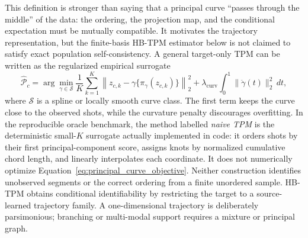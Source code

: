 \documentclass[preprint,12pt,number]{elsarticle}
\begin{document}
This definition is stronger than saying that a principal curve ``passes through the middle'' of the data: the ordering, the projection map, and the conditional expectation must be mutually compatible. It motivates the trajectory representation, but the finite-basis HB-TPM estimator below is not claimed to satisfy exact population self-consistency. A general target-only TPM can be written as the regularized empirical surrogate
\begin{equation}
	\widehat{\mathcal{P}}_c
	=
	\arg\min_{\gamma\in\mathcal{S}}
	\frac{1}{K}\sum_{k=1}^{K}
	\left\lVert
		z_{c,k}-\gamma\{\pi_\gamma(z_{c,k})\}
	\right\rVert_2^2
	+
	\lambda_{\mathrm{curv}}
	\int_0^1 \lVert \ddot{\gamma}(t)\rVert_2^2\,dt ,
	\label{eq:principal_curve_objective}
\end{equation}
where $\mathcal{S}$ is a spline or locally smooth curve class. The first term keeps the curve close to the observed shots, while the curvature penalty discourages overfitting. In the reproducible oracle benchmark, the method labelled \emph{naive TPM} is the deterministic small-$K$ surrogate actually implemented in code: it orders shots by their first principal-component score, assigns knots by normalized cumulative chord length, and linearly interpolates each coordinate. It does not numerically optimize Equation~\ref{eq:principal_curve_objective}. Neither construction identifies unobserved segments or the correct ordering from a finite unordered sample. HB-TPM obtains conditional identifiability by restricting the target to a source-learned trajectory family. A one-dimensional trajectory is deliberately parsimonious; branching or multi-modal support requires a mixture or principal graph.
\end{document}
